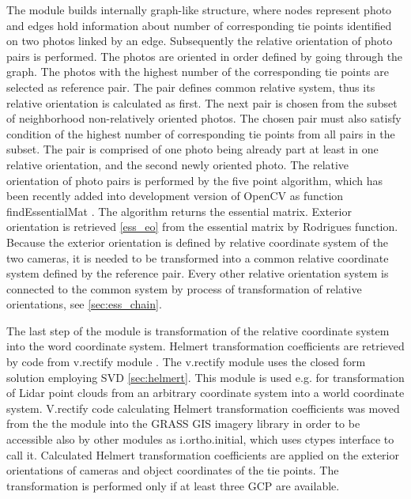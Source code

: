 \documentclass[a4paper,12pt]{article}
\begin{document}



The module builds internally graph-like structure, where nodes represent photo and edges hold information 
about number of corresponding tie points identified on two photos linked by an edge.
Subsequently the relative orientation of photo pairs is performed. The photos are oriented in order defined by going through the graph.
The photos with the highest number of the corresponding tie points are selected as reference pair. 
The pair defines common relative system, thus its relative orientation is calculated as first. 
The next pair is chosen from the subset of neighborhood non-relatively oriented photos. The chosen pair 
must also satisfy condition of the highest number of corresponding tie points from all pairs in the subset. The pair is comprised of one photo being already 
part at least in one relative orientation, and the second newly oriented photo. The relative orientation of photo 
pairs is performed by  the five point algorithm, which has been recently added into development version of OpenCV as function findEssentialMat \cite{calib_manual2013opencv}.
The algorithm returns the essential matrix. Exterior orientation is retrieved \ref{ess_eo} from the essential matrix by Rodrigues \cite{calib_manual2013opencv} 
function. Because the exterior orientation is defined by relative coordinate system of the two cameras, it is needed to be transformed into 
a common relative coordinate system defined by the reference pair.
Every other relative orientation system is connected to the common system by process of transformation of relative orientations, see \ref{sec:ess_chain}.

The last step of the module is transformation of the relative coordinate system into the word coordinate system.
Helmert 
transformation coefficients are retrieved by code from v.rectify module \cite{v.rectify}.
The v.rectify module uses the closed form solution employing SVD \ref{sec:helmert}.
This module is used e.g. for transformation of Lidar point clouds from an arbitrary coordinate system into 
a world coordinate system. 
V.rectify code calculating Helmert transformation coefficients
was moved from the the module into the GRASS GIS imagery library in order to be accessible also by other modules as i.ortho.initial,
which uses ctypes interface to call it.
Calculated Helmert transformation coefficients are applied on the exterior orientations of cameras and object coordinates of the tie points.
The transformation is performed only if at least three GCP are available.
\end{document}

